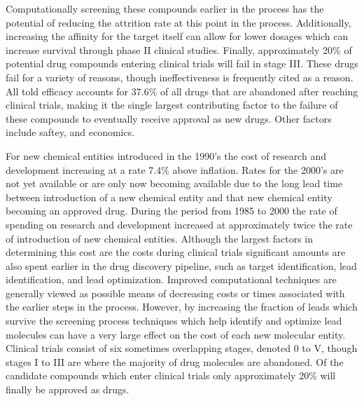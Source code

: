 Computationally screening these compounds earlier in the process has the potential of reducing the attrition rate at this point in the process.
Additionally, increasing the affinity for the target itself can allow for lower dosages which can increase survival through phase II clinical studies.
Finally, approximately 20\% of potential drug compounds entering clinical trials will fail in stage III.
These drugs fail for a variety of reasons, though ineffectiveness is frequently cited as a reason.
All told efficacy accounts for 37.6\% of all drugs that are abandoned after reaching clinical trials, making it the single largest contributing factor to the failure of these compounds to eventually receive approval as new drugs.
Other factors include saftey, and economics.
\cite{dimasi2001risks}

For new chemical entities introduced in the 1990's the cost of research and development increasing at a rate 7.4\% above inflation.
Rates for the 2000's are not yet available or are only now becoming available due to the long lead time between introduction of a new chemical entity and that new chemical entity becoming an approved drug.
During the period from 1985 to 2000 the rate of spending on research and development increased at approximately twice the rate of introduction of new chemical entities.
Although the largest factors in determining this cost are the costs during clinical trials significant amounts are also spent earlier in the drug discovery pipeline, such as target identification, lead identification, and lead optimization.
Improved computational techniques are generally viewed as possible means of decreasing costs or times associated with the earlier steps in the process.
However, by increasing the fraction of leads which survive the screening process techniques which help identify and optimize lead molecules can have a very large effect on the cost of each new molecular entity.
Clinical trials consist of six sometimes overlapping stages, denoted 0 to V, though stages I to III are where the majority of drug molecules are abandoned.
Of the candidate compounds which enter clinical trials only approximately 20\% will finally be approved as drugs.
\cite{dimasi2003price}


